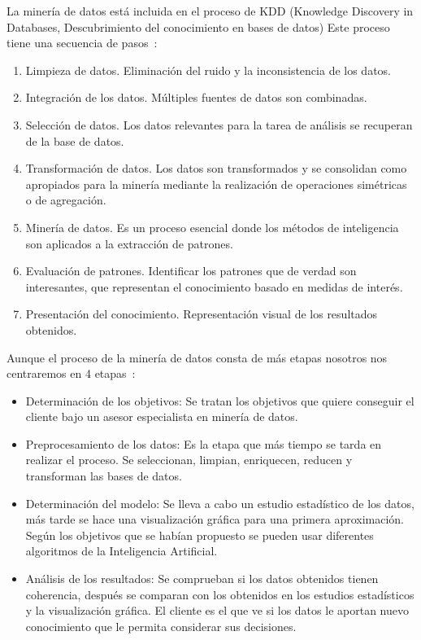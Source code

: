 La minería de datos está incluida en el proceso de KDD (Knowledge Discovery in Databases, Descubrimiento del conocimiento en bases de datos) Este proceso tiene una secuencia de pasos~\cite{mineria_KDD}:

\begin{enumerate}[1.]
	\item Limpieza de datos. Eliminación del ruido y la inconsistencia de los datos.
	\item Integración de los datos. Múltiples fuentes de datos son combinadas.
	\item Selección de datos. Los datos relevantes para la tarea de análisis se recuperan de la base de datos.
	\item Transformación de datos. Los datos son transformados y se consolidan como apropiados para la minería mediante la realización de operaciones simétricas o de agregación.
	\item Minería de datos. Es un proceso esencial donde los métodos de inteligencia son aplicados a la extracción de patrones.
	\item Evaluación de patrones. Identificar los patrones que de verdad son interesantes, que representan el conocimiento basado en medidas de interés.
	\item Presentación del conocimiento. Representación visual de los resultados obtenidos.
\end{enumerate}

Aunque el proceso de la minería de datos consta de más etapas nosotros nos centraremos en 4 etapas~\cite{datamining}:
\begin{itemize}
	\item Determinación de los objetivos: Se tratan los objetivos que quiere conseguir el cliente bajo un asesor especialista en minería de datos.
	\item Preprocesamiento de los datos: Es la etapa que más tiempo se tarda en realizar el proceso. Se seleccionan, limpian, enriquecen, reducen y transforman las bases de datos.
	\item Determinación del modelo: Se lleva a cabo un estudio estadístico de los datos, más tarde se hace una visualización gráfica para una primera aproximación. Según los objetivos que se habían propuesto se pueden usar diferentes algoritmos de la Inteligencia Artificial.
	\item  Análisis de los resultados: Se comprueban si los datos obtenidos tienen coherencia, después se comparan con los obtenidos en los estudios estadísticos y la visualización gráfica. El cliente es el que ve si los datos le aportan nuevo conocimiento que le permita considerar sus decisiones.
\end{itemize}

